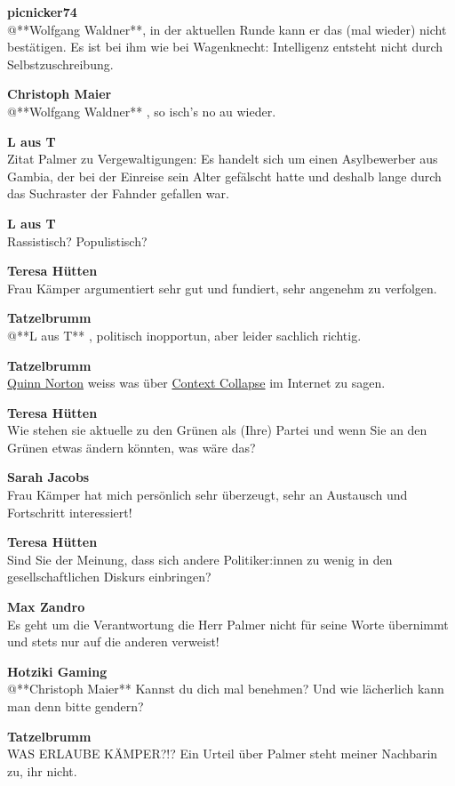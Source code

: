 \documentclass[]{article}
\begin{document}
\textbf{picnicker74}\\
@**Wolfgang Waldner**, in der aktuellen Runde kann er das (mal wieder)
nicht bestätigen. Es ist bei ihm wie bei Wagenknecht: Intelligenz
entsteht nicht durch Selbstzuschreibung.

\textbf{Christoph Maier}\\
@**Wolfgang Waldner** , so isch's no au wieder.

\textbf{L aus T}\\
Zitat Palmer zu Vergewaltigungen: Es handelt sich um einen Asylbewerber
aus Gambia, der bei der Einreise sein Alter gefälscht hatte und deshalb
lange durch das Suchraster der Fahnder gefallen war.

\textbf{L aus T}\\
Rassistisch? Populistisch?

\textbf{Teresa Hütten}\\
Frau Kämper argumentiert sehr gut und fundiert, sehr angenehm zu
verfolgen.

\textbf{Tatzelbrumm}\\
@**L aus T** , politisch inopportun, aber leider sachlich richtig.

\textbf{Tatzelbrumm}\\
\protect\hyperlink{QuinnNorton}{Quinn Norton} weiss was über
\protect\hyperlink{ContextCollapse}{Context Collapse} im Internet zu
sagen.

\textbf{Teresa Hütten}\\
Wie stehen sie aktuelle zu den Grünen als (Ihre) Partei und wenn Sie an
den Grünen etwas ändern könnten, was wäre das?

\textbf{Sarah Jacobs}\\
Frau Kämper hat mich persönlich sehr überzeugt, sehr an Austausch und
Fortschritt interessiert!

\textbf{Teresa Hütten}\\
Sind Sie der Meinung, dass sich andere Politiker:innen zu wenig in den
gesellschaftlichen Diskurs einbringen?

\textbf{Max Zandro}\\
Es geht um die Verantwortung die Herr Palmer nicht für seine Worte
übernimmt und stets nur auf die anderen verweist!

\textbf{Hotziki Gaming}\\
@**Christoph Maier** Kannst du dich mal benehmen? Und wie lächerlich
kann man denn bitte gendern?

\textbf{Tatzelbrumm}\\
WAS ERLAUBE KÄMPER?!? Ein Urteil über Palmer steht meiner Nachbarin zu,
ihr nicht.
\end{document}
